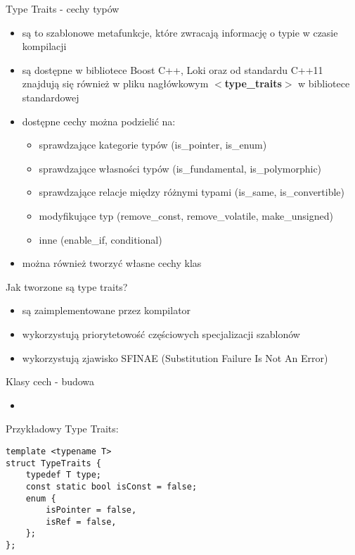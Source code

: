 \documentclass[11pt]{beamer}
\begin{document}
\begin{frame}[fragile]{Type Traits - cechy typów}
    \begin{itemize}
     \item są to szablonowe metafunkcje, które zwracają informację o typie w czasie kompilacji
     \item są dostępne w bibliotece Boost C++, Loki oraz od standardu C++11 znajdują się również w pliku nagłówkowym \textbf{$<$type\_traits$>$} w bibliotece standardowej
     \item dostępne cechy można podzielić na:
      \begin{itemize}
       \item sprawdzające kategorie typów (is\_pointer, is\_enum)
       \item sprawdzające własności typów (is\_fundamental, is\_polymorphic)
       \item sprawdzające relacje między różnymi typami (is\_same, is\_convertible)
       \item modyfikujące typ (remove\_const, remove\_volatile, make\_unsigned)
       \item inne (enable\_if, conditional)
      \end{itemize}
    \item można również tworzyć własne cechy klas
    \end{itemize}
\end{frame}

\begin{frame}[fragile]{Jak tworzone są type traits?}
 \begin{itemize}
  \item są zaimplementowane przez kompilator
  \item wykorzystują priorytetowość częściowych specjalizacji szablonów
  \item wykorzystują zjawisko SFINAE (Substitution Failure Is Not An Error)
 \end{itemize}
\end{frame}


\begin{frame}[fragile]{Klasy cech - budowa}
    \begin{itemize}
     \item 
    \end{itemize}
    
    Przykładowy Type Traits:
    \begin{lstlisting}[frame=single]
template <typename T>
struct TypeTraits {
    typedef T type;
    const static bool isConst = false;
    enum {
        isPointer = false,
        isRef = false,
    };
};
    \end{lstlisting}
    
\end{frame}
\end{document}
